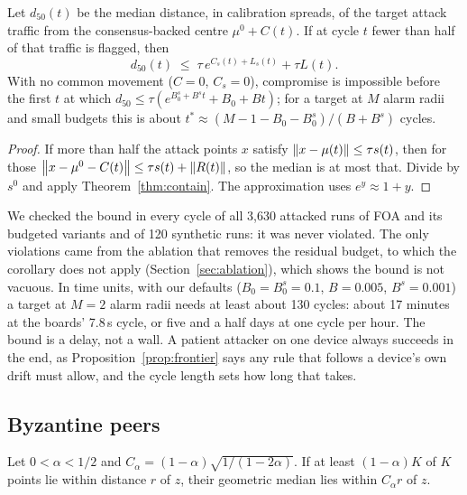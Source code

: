 \begin{corollary}\label{cor:ttc}
Let $d_{50}(t)$ be the median distance, in calibration spreads, of the target attack traffic from the
consensus-backed centre $\mu^0+C(t)$. If at cycle $t$ fewer than half of that traffic is flagged, then
\begin{equation}
d_{50}(t)\;\le\;\tau\, e^{C_s(t)+L_s(t)}+\tau L(t).\label{eq:reach}
\end{equation}
With no common movement ($C=0$, $C_s=0$), compromise is impossible before the first $t$ at which
$d_{50}\le\tau(e^{B_0^s+B^s t}+B_0+Bt)$; for a target at $M$ alarm radii and small budgets this is about
$t^\ast\approx (M-1-B_0-B_0^s)/(B+B^s)$ cycles.
\end{corollary}
\begin{proof}
If more than half the attack points $x$ satisfy $\left\lVert x-\mu(t) \right\rVert\le\tau s(t)$, then for those
$\left\lVert x-\mu^0-C(t) \right\rVert\le \tau s(t)+\left\lVert R(t) \right\rVert$, so the median is at most that. Divide by $s^0$ and apply
Theorem~\ref{thm:contain}. The approximation uses $e^{y}\approx1+y$.
\end{proof}
We checked the bound in every cycle of all 3{,}630 attacked runs of FOA and its budgeted variants and of 120
synthetic runs: it was never violated. The only violations came from the ablation that removes the
residual budget, to which the corollary does not apply (Section~\ref{sec:ablation}), which shows the
bound is not vacuous. In time units, with our defaults ($B_0=B_0^s=0.1$, $B=0.005$, $B^s=0.001$) a
target at $M=2$ alarm radii needs at least about 130 cycles: about 17 minutes at the boards' 7.8\,s
cycle, or five and a half days at one cycle per hour. The bound is a delay, not a wall. A patient
attacker on one device always succeeds in the end, as Proposition~\ref{prop:frontier} says any rule
that follows a device's own drift must allow, and the cycle length sets how long that takes.

\subsection{Byzantine peers}
\begin{lemma}\label{lem:gm}
Let $0<\alpha<1/2$ and $C_\alpha=(1-\alpha)\sqrt{1/(1-2\alpha)}$. If at least $(1-\alpha)K$ of $K$ points
lie within distance $r$ of $z$, their geometric median lies within $C_\alpha r$ of $z$.
\end{lemma}

